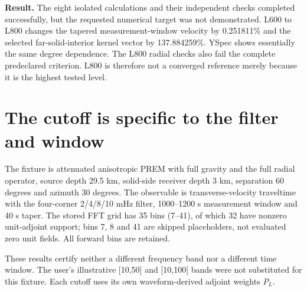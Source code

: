 \documentclass[11pt,a4paper]{article}
\begin{document}
\textbf{Result.} The eight isolated calculations and their independent checks completed successfully, but the requested numerical target was not demonstrated. L600 to L800 changes the tapered measurement-window velocity by 0.251811\% and the selected far-solid-interior kernel vector by 137.884259\%. YSpec shows essentially the same degree dependence. The L800 radial checks also fail the complete predeclared criterion. L800 is therefore not a converged reference merely because it is the highest tested level.

\section{The cutoff is specific to the filter and window}
The fixture is attenuated anisotropic PREM with full gravity and the full radial operator, source depth 29.5 km, solid-side receiver depth 3 km, separation 60 degrees and azimuth 30 degrees. The observable is transverse-velocity traveltime with the four-corner 2/4/8/10 mHz filter, 1000--1200 s measurement window and 40 s taper. The stored FFT grid has 35 bins (7--41), of which 32 have nonzero unit-adjoint support; bins 7, 8 and 41 are skipped placeholders, not evaluated zero unit fields. All forward bins are retained.

These results certify neither a different frequency band nor a different time window. The user's illustrative [10,50] and [10,100] bands were not substituted for this fixture. Each cutoff uses its own waveform-derived adjoint weights $P_L$.
\end{document}
